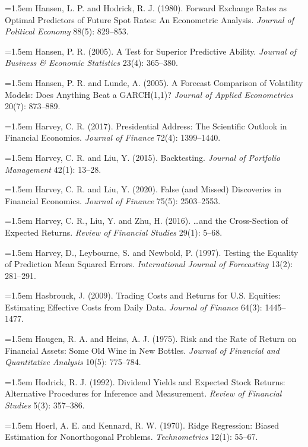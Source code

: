\hangindent=1.5em Hansen, L. P. and Hodrick, R. J. (1980). Forward Exchange Rates as Optimal Predictors of Future Spot Rates: An Econometric Analysis. \emph{Journal of Political Economy} 88(5): 829--853.

\hangindent=1.5em Hansen, P. R. (2005). A Test for Superior Predictive Ability. \emph{Journal of Business \& Economic Statistics} 23(4): 365--380.

\hangindent=1.5em Hansen, P. R. and Lunde, A. (2005). A Forecast Comparison of Volatility Models: Does Anything Beat a GARCH(1,1)? \emph{Journal of Applied Econometrics} 20(7): 873--889.

\hangindent=1.5em Harvey, C. R. (2017). Presidential Address: The Scientific Outlook in Financial Economics. \emph{Journal of Finance} 72(4): 1399--1440.

\hangindent=1.5em Harvey, C. R. and Liu, Y. (2015). Backtesting. \emph{Journal of Portfolio Management} 42(1): 13--28.

\hangindent=1.5em Harvey, C. R. and Liu, Y. (2020). False (and Missed) Discoveries in Financial Economics. \emph{Journal of Finance} 75(5): 2503--2553.

\hangindent=1.5em Harvey, C. R., Liu, Y. and Zhu, H. (2016). \ldots and the Cross-Section of Expected Returns. \emph{Review of Financial Studies} 29(1): 5--68.

\hangindent=1.5em Harvey, D., Leybourne, S. and Newbold, P. (1997). Testing the Equality of Prediction Mean Squared Errors. \emph{International Journal of Forecasting} 13(2): 281--291.

\hangindent=1.5em Hasbrouck, J. (2009). Trading Costs and Returns for U.S. Equities: Estimating Effective Costs from Daily Data. \emph{Journal of Finance} 64(3): 1445--1477.

\hangindent=1.5em Haugen, R. A. and Heins, A. J. (1975). Risk and the Rate of Return on Financial Assets: Some Old Wine in New Bottles. \emph{Journal of Financial and Quantitative Analysis} 10(5): 775--784.

\hangindent=1.5em Hodrick, R. J. (1992). Dividend Yields and Expected Stock Returns: Alternative Procedures for Inference and Measurement. \emph{Review of Financial Studies} 5(3): 357--386.

\hangindent=1.5em Hoerl, A. E. and Kennard, R. W. (1970). Ridge Regression: Biased Estimation for Nonorthogonal Problems. \emph{Technometrics} 12(1): 55--67.

